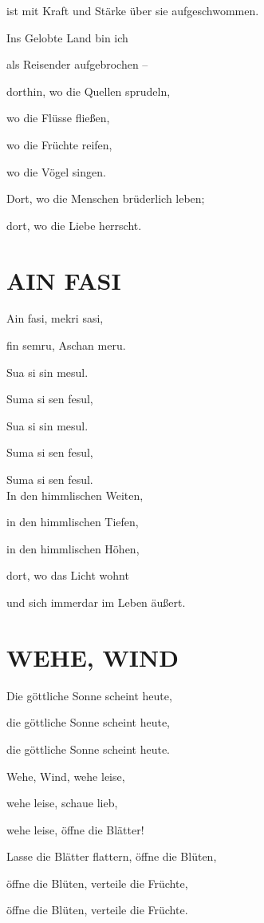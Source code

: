 \documentclass[11pt,a5paper,twoside]{article}
\begin{document}
ist mit Kraft und Stärke über sie aufgeschwommen.

Ins Gelobte Land bin ich 

als Reisender aufgebrochen  --

dorthin, wo die Quellen sprudeln,

wo die Flüsse fließen, 

wo die Früchte reifen,

wo die Vögel singen.

Dort, wo die Menschen brüderlich leben;

dort, wo die Liebe herrscht.

\section[Ain fasi]{AIN FASI}

Ain fasi, mekri sasi,

fin semru, Aschan meru.

Sua si sin mesul.

Suma si sen fesul,

Sua si sin mesul.

Suma si sen fesul,

Suma si sen fesul.\\

In den himmlischen Weiten,

in den himmlischen Tiefen,

in den himmlischen Höhen,

dort, wo das Licht wohnt

und sich immerdar im Leben äußert. 




\section[Wehe, Wind]{WEHE, WIND}

Die göttliche Sonne scheint heute, 

die göttliche Sonne scheint heute, 

die göttliche Sonne scheint heute.
 
Wehe, Wind, wehe leise, 

wehe leise, schaue lieb,

wehe leise, öffne die Blätter!

Lasse die Blätter flattern, öffne die Blüten, 

öffne die Blüten, verteile die Früchte,

öffne die Blüten, verteile die Früchte.
\end{document}
